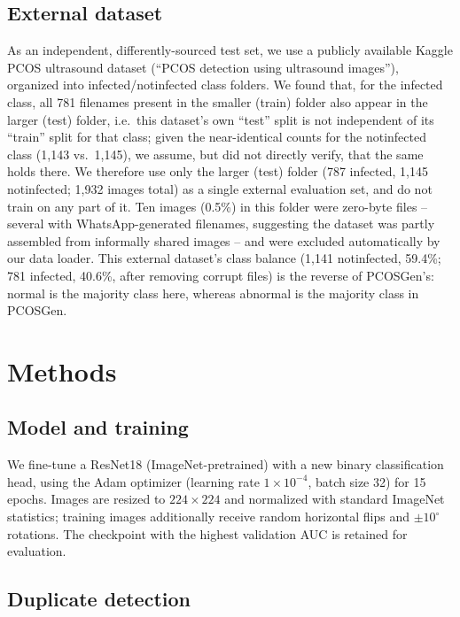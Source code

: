 \documentclass[conference]{IEEEtran}
\begin{document}
\subsection{External dataset}

As an independent, differently-sourced test set, we use a publicly available Kaggle PCOS ultrasound dataset (``PCOS detection using ultrasound images''), organized into infected/notinfected class folders. We found that, for the infected class, all 781 filenames present in the smaller (train) folder also appear in the larger (test) folder, i.e.\ this dataset's own ``test'' split is not independent of its ``train'' split for that class; given the near-identical counts for the notinfected class (1,143 vs.\ 1,145), we assume, but did not directly verify, that the same holds there. We therefore use only the larger (test) folder (787 infected, 1,145 notinfected; 1,932 images total) as a single external evaluation set, and do not train on any part of it. Ten images (0.5\%) in this folder were zero-byte files -- several with WhatsApp-generated filenames, suggesting the dataset was partly assembled from informally shared images -- and were excluded automatically by our data loader. This external dataset's class balance (1,141 notinfected, 59.4\%; 781 infected, 40.6\%, after removing corrupt files) is the reverse of PCOSGen's: normal is the majority class here, whereas abnormal is the majority class in PCOSGen.

\section{Methods}

\subsection{Model and training}

We fine-tune a ResNet18 (ImageNet-pretrained) with a new binary classification head, using the Adam optimizer (learning rate $1\times10^{-4}$, batch size 32) for 15 epochs. Images are resized to $224\times224$ and normalized with standard ImageNet statistics; training images additionally receive random horizontal flips and $\pm10^{\circ}$ rotations. The checkpoint with the highest validation AUC is retained for evaluation.

\subsection{Duplicate detection}
\end{document}
